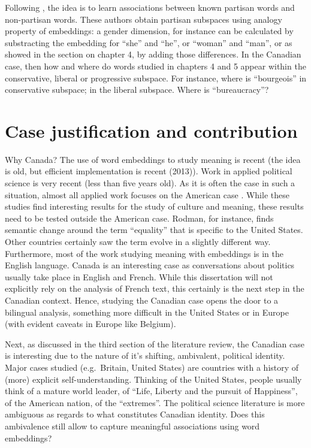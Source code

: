 \documentclass[
  openany]{book}
\begin{document}
Following \citet{wu2019partisan}, the idea is to learn associations between known partisan words and non-partisan words. These authors obtain partisan subspaces using analogy property of embeddings: a gender dimension, for instance can be calculated by substracting the embedding for ``she'' and ``he'', or ``woman'' and ``man'', or as showed in the section on chapter 4, by adding those differences. In the Canadian case, then how and where do words studied in chapters 4 and 5 appear within the conservative, liberal or progressive subspace. For instance, where is ``bourgeois'' in conservative subspace; in the liberal subspace. Where is ``bureaucracy''?

\hypertarget{case-justification-and-contribution}{%
\chapter{Case justification and contribution}\label{case-justification-and-contribution}}

Why Canada? The use of word embeddings to study meaning is recent (the idea is old, but efficient implementation is recent (2013)). Work in applied political science is very recent (less than five years old). As it is often the case in such a situation, almost all applied work focuses on the American case \citep[\citet{kozlowski2019geometry}]{rodman2020timely}. While these studies find interesting results for the study of culture and meaning, these results need to be tested outside the American case. Rodman, for instance, finds semantic change around the term ``equality'' that is specific to the United States. Other countries certainly saw the term evolve in a slightly different way. Furthermore, most of the work studying meaning with embeddings is in the English language. Canada is an interesting case as conversations about politics usually take place in English and French. While this dissertation will not explicitly rely on the analysis of French text, this certainly is the next step in the Canadian context. Hence, studying the Canadian case opens the door to a bilingual analysis, something more difficult in the United States or in Europe (with evident caveats in Europe like Belgium).

Next, as discussed in the third section of the literature review, the Canadian case is interesting due to the nature of it's shifting, ambivalent, political identity. Major cases studied (e.g.~Britain, United States) are countries with a history of (more) explicit self-understanding. Thinking of the United States, people usually think of a mature world leader, of ``Life, Liberty and the pursuit of Happiness'', of the American nation, of the ``extremes''. The political science literature is more ambiguous as regards to what constitutes Canadian identity. Does this ambivalence still allow to capture meaningful associations using word embeddings?
\end{document}

